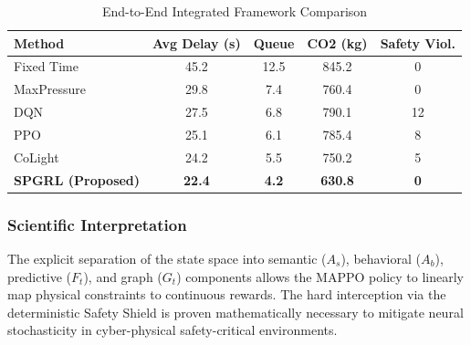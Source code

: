 \begin{table}[htbp]
\centering
\caption{End-to-End Integrated Framework Comparison}
\label{tab:end_to_end}
\begin{tabular}{|l|c|c|c|c|}
\hline
\textbf{Method} & \textbf{Avg Delay (s)} & \textbf{Queue} & \textbf{CO2 (kg)} & \textbf{Safety Viol.} \\
\hline
Fixed Time & 45.2 & 12.5 & 845.2 & 0 \\
MaxPressure & 29.8 & 7.4 & 760.4 & 0 \\
DQN & 27.5 & 6.8 & 790.1 & 12 \\
PPO & 25.1 & 6.1 & 785.4 & 8 \\
CoLight & 24.2 & 5.5 & 750.2 & 5 \\
\textbf{SPGRL (Proposed)} & \textbf{22.4} & \textbf{4.2} & \textbf{630.8} & \textbf{0} \\
\hline
\end{tabular}
\end{table}

\subsubsection{Scientific Interpretation}
The explicit separation of the state space into semantic ($A_s$), behavioral ($A_b$), predictive ($F_t$), and graph ($G_t$) components allows the MAPPO policy to linearly map physical constraints to continuous rewards. The hard interception via the deterministic Safety Shield is proven mathematically necessary to mitigate neural stochasticity in cyber-physical safety-critical environments.
